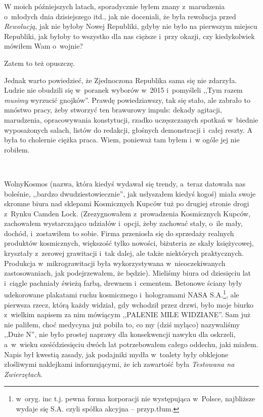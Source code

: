 \documentclass[oneside,polish,11pt,sfheadings]{mwbk}
\begin{document}
W moich późniejszych latach, sporadycznie byłem znany z~marudzenia o~młodych dnia dzisiejszego itd., jak nie doceniali, że była rewolucja
przed \emph{Rewolucją}, jak nie byłoby Nowej Republiki, gdyby nie było
na pierwszym miejscu Republiki, jak byłoby to wszystko dla nas cięższe i~przy okazji, czy kiedykolwiek mówiłem Wam o~wojnie?

Zatem to też opuszczę.

Jednak warto powiedzieć, że Zjednoczona Republika sama się nie zdarzyła.
Ludzie nie obudzili się w~poranek wyborów w~2015 i~pomyśleli ,,Tym razem
\emph{musimy} wyrzucić gnojków''. Prawdę powiedziawszy, tak się stało,
ale zabrało to mnóstwo pracy, żeby stworzyć ten brawurowy impuls: dekady
agitacji, marudzenia, opracowywania konstytucji, rzadko uczęszczanych
spotkań w~biednie wyposażonych salach, listów do redakcji, głośnych
demonstracji i~całej reszty. A była to cholernie ciężka praca. Wiem,
ponieważ tam byłem i~w ogóle jej nie robiłem.

~

WolnyKosmos (nazwa, która kiedyś wydawał się trendy, a~teraz datowała
nas boleśnie, ,,bardzo dwudziestowiecznie'', jak usłyszałem kiedyś kogoś)
miała swoje skromne biura nad sklepami Kosmicznych Kupców tuż po drugiej
stronie drogi z~Rynku Camden Lock. (Zrezygnowałem z~prowadzenia
Kosmicznych Kupców, zachowałem wystarczająco udziałów i~opcji, żeby
zachować stały, o~ile mały, dochód, i~zostawiłem to sobie. Firma
przeniosła się do sprzedaży realnych produktów kosmicznych, większość
tylko nowości, biżuteria ze skały księżycowej, kryształy z~zerowej
grawitacji i~tak dalej, ale także niektórych praktycznych. Produkcja w~mikrograwitacji była wykorzystywana w~nieoczekiwanych zastosowaniach, jak
podejrzewałem, że będzie). Mieliśmy biura od dziesięciu lat i~ciągle
pachniały świeżą farbą, drewnem i~cementem. Betonowe ściany były
udekorowane plakatami ruchu kosmicznego i~hologramami NASA S.A.\footnote{w~oryg. inc t.j. pewna forma korporacji nie występująca w~Polsce,
najbliższe wydaje się S.A. czyli spółka akcyjna -- przyp.tłum.}, ale
pierwsza rzecz, którą każdy widział, gdy wchodził przez drzwi, było moje
biurko z~wielkim napisem za nim mówiącym ,,PALENIE MILE WIDZIANE''. Sam
już nie paliłem, choć medycyna już pobiła to, co my (dziś myląco)
nazywaliśmy ,,Duże N'', nie było prostej naprawy dla konsekwencji nawyku
dla oskrzeli, a~w~wieku sześćdziesięciu dwóch lat potrzebowałem
całego oddechu, jaki miałem. Napis był kwestią zasady, jak podajniki
mydła w~toalety były obklejone złośliwymi naklejkami informującymi, że ich
zawartość była \emph{Testowana na Zwierzętach}.
\end{document}

